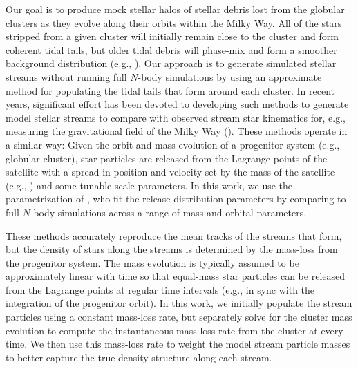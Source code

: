 \documentclass[manuscript, letterpaper]{aastex6}
\begin{document}
Our goal is to produce mock stellar halos of stellar debris lost from the
globular clusters as they evolve along their orbits within the Milky Way.
All of the stars stripped from a given cluster will initially remain close to
the cluster and form coherent tidal tails, but older tidal debris will phase-mix
and form a smoother background distribution (e.g., \citealt{Helmi:1999}).
Our approach is to generate simulated stellar streams without running full
$N$-body simulations by using an approximate method for populating the tidal
tails that form around each cluster.
In recent years, significant effort has been devoted to developing such methods
to generate model stellar streams to compare with observed stream star
kinematics for, e.g., measuring the gravitational field of the Milky Way
(\citealt{Kupper:2012,Bonaca:2014,Gibbons:2014,Bovy:2014,Fardal:2015}).
These methods operate in a similar way:
Given the orbit and mass evolution of a progenitor system (e.g., globular
cluster), star particles are released from the Lagrange points of the satellite
with a spread in position and velocity set by the mass of the satellite (e.g.,
\citealt{Johnston:1999}) and some tunable scale parameters.
In this work, we use the parametrization of \citealt{Fardal:2015}, who fit the
release distribution parameters by comparing to full $N$-body simulations across
a range of mass and orbital parameters.

These methods accurately reproduce the mean tracks of the streams that form, but
the density of stars along the streams is determined by the mass-loss from the
progenitor system.
The mass evolution is typically assumed to be approximately linear with time so
that equal-mass star particles can be released from the Lagrange points at
regular time intervals (e.g., in sync with the integration of the progenitor
orbit).
In this work, we initially populate the stream particles using a constant
mass-loss rate, but separately solve for the cluster mass evolution to compute
the instantaneous mass-loss rate from the cluster at every time.
We then use this mass-loss rate to weight the model stream particle masses
to better capture the true density structure along each stream.
\end{document}
